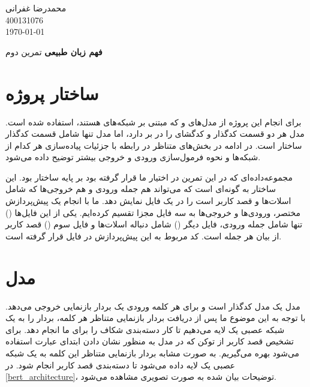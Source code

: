 \documentclass[12pt, a4paper]{book}
\newcommand{\coursetitle}{فهم زبان طبیعی}
\newcommand{\doctitle}{تمرین دوم}
\newcommand{\name}{محمدرضا غفرانی}
\newcommand{\studentno}{400131076}
\newcommand{\todaydate}{\today}
\begin{document}
\begin{flushleft}
    \name \\
    \studentno \\
    \todaydate
\end{flushleft}

\begin{center}
    \huge
    \textbf{\coursetitle}
    \break
    \large
    \doctitle
\end{center}

\thispagestyle{plain}

\section*{ساختار پروژه}


برای انجام این پروژه از مدل‌های  و  که مبتنی بر شبکه‌های  هستند،
استفاده شده است. مدل  هر دو قسمت کدگذار و کدگشای  را در بر دارد،
اما مدل  تنها شامل قسمت کد‌گذار ساختار  است. در ادامه در بخش‌های متناظر
در رابطه با جزئیات پیاده‌سازی هر کدام از شبکه‌ها و نحوه فرمول‌سازی ورودی و خروجی بیشتر توضیح داده می‌شود.

‌مجموعه‌داده‌ای که در این تمرین در اختیار ما قرار گرفته بود بر پایه ساختار  بود. این ساختار
به گونه‌ای است که می‌تواند هم جمله ورودی و هم خروجی‌ها که شامل اسلات‌ها و قصد کاربر است را در یک فایل
نمایش دهد. ما با انجام یک پیش‌پردازش مختصر، ورودی‌ها و خروجی‌ها به سه فایل مجزا تقسیم کرده‌ایم.
یکی از این فایل‌ها () تنها شامل جمله ورودی،
فایل دیگر () شامل دنباله اسلات‌ها و فایل سوم () قصد کاربر از بیان
هر جمله است. کد مربوط به این پیش‌پردازش در فایل  قرار گرفته است.

\section*{مدل }


مدل  یک مدل کدگذار است و برای هر کلمه ورودی یک بردار بازنمایی خروجی می‌دهد. با توجه به این
موضوع ما پس از دریافت بردار بازنمایی متناظر هر کلمه، بردار را به یک شبکه عصبی یک لایه می‌دهیم تا
کار دسته‌بندی شکاف را برای ما انجام دهد. برای تشخیص قصد کاربر از توکن \lr{[CLS]} که در مدل 
به منظور نشان دادن ابتدای عبارت استفاده می‌شود بهره می‌گیریم. به صورت مشابه بردار بازنمایی متناظر
این کلمه به یک شبکه عصبی یک لایه داده می‌شود تا دسته‌بندی قصد کاربر انجام شود. در \autoref{bert_architecture}،
توضیحات بیان شده به صورت تصویری مشاهده می‌شود.
\end{document}
